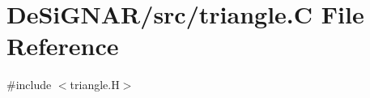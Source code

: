 \hypertarget{triangle_8_c}{}\section{De\+Si\+G\+N\+A\+R/src/triangle.C File Reference}
\label{triangle_8_c}
{\ttfamily \#include $<$triangle.\+H$>$}\newline
